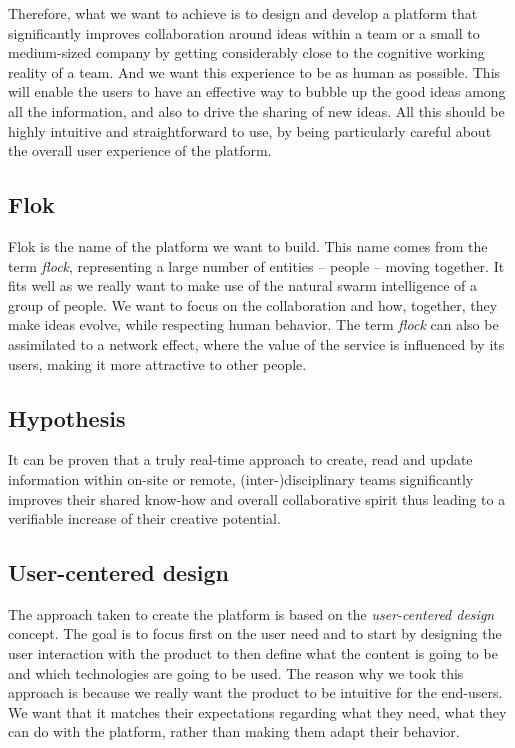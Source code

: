 \documentclass[a4paper,12pt,twoside]{article}
\begin{document}
Therefore, what we want to achieve is to design and develop a platform that significantly improves collaboration around ideas within a team or a small to medium-sized company by getting considerably close to the cognitive working reality of a team.
And we want this experience to be as human as possible.
This will enable the users to have an effective way to bubble up the good ideas among all the information, and also to drive the sharing of new ideas.
All this should be highly intuitive and straightforward to use, by being particularly careful about the overall user experience of the platform.

\subsection{Flok}
Flok is the name of the platform we want to build.
This name comes from the term \emph{flock}, representing a large number of entities – people – moving together.
It fits well as we really want to make use of the natural swarm intelligence of a group of people.
We want to focus on the collaboration and how, together, they make ideas evolve, while respecting human behavior.
The term \emph{flock} can also be assimilated to a network effect, where the value of the service is influenced by its users, making it more attractive to other people.

\subsection{Hypothesis}
\label{hypothesis}
It can be proven that a truly real-time approach to create, read and update information within on-site or remote, (inter-)disciplinary teams significantly improves their shared know-how and overall collaborative spirit thus leading to a verifiable increase of their creative potential.

\subsection{User-centered design}
The approach taken to create the platform is based on the \emph{user-centered design} concept.
The goal is to focus first on the user need and to start by designing the user interaction with the product to then define what the content is going to be and which technologies are going to be used.
The reason why we took this approach is because we really want the product to be intuitive for the end-users.
We want that it matches their expectations regarding what they need, what they can do with the platform, rather than making them adapt their behavior.
\end{document}
